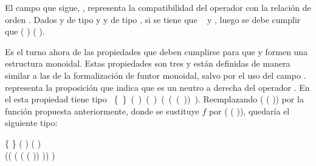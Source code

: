 El campo que sigue, , representa la compatibilidad del operador  con la relación de orden . Dados  y  de tipo  y  y  de tipo , si se tiene que \hbox{  } y   , luego se debe cumplir que ( )  ( ). 

Es el turno ahora de las propiedades que deben cumplirse para que  y  formen una estructura monoidal. Estas propiedades son tres y están definidas de manera similar a las de la formalización de funtor monoidal, salvo por el uso del campo .  representa la proposición que indica que  es un neutro a derecha del operador . En el   esta propiedad tiene tipo \hbox{\AgdaSymbol{$\forall$} \{ \AgdaSymbol{:} \} \AgdaSymbol{$\rightarrow$} ( \AgdaSymbol{:} ) \AgdaSymbol{$\rightarrow$} (  )  ( (\AgdaSymbol{$\lambda$}  \AgdaSymbol{$\rightarrow$} ( )) )}. Reemplazando  (\AgdaSymbol{$\lambda$}  \AgdaSymbol{$\rightarrow$} ( )) por la función propuesta anteriormente, donde se sustituye $f$ por (\AgdaSymbol{$\lambda$}  \AgdaSymbol{$\rightarrow$} ( )), quedaría el siguiente tipo: 
\begin{center}
\AgdaSymbol{$\forall$} \{ \AgdaSymbol{:} \} \AgdaSymbol{$\rightarrow$} ( \AgdaSymbol{:} ) \AgdaSymbol{$\rightarrow$} (  )   \\ ((\AgdaSymbol{$\lambda$}  \AgdaSymbol{$\rightarrow$}  \AgdaField{$\gg=$} (\AgdaSymbol{$\lambda$}  \AgdaSymbol{$\rightarrow$}  (\AgdaSymbol{$\lambda$}  \AgdaSymbol{$\rightarrow$} ( )) )) )
\end{center}

